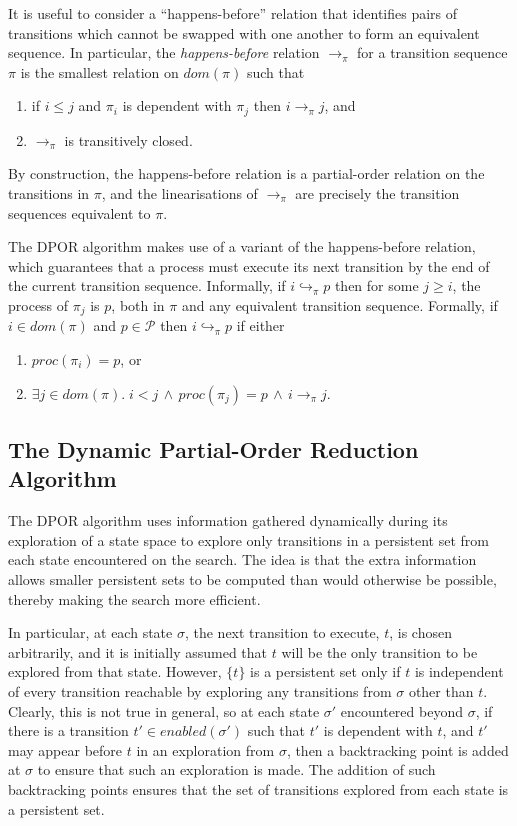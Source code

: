 \documentclass[12pt,a4paper,twoside,openany]{report}
\begin{document}
It is useful to consider a
``happens-before'' relation that identifies
pairs of transitions which
cannot be swapped with one another
to form an equivalent sequence.
In particular, the \emph{happens-before}
relation $\longrightarrow_\pi$ for a transition
sequence $\pi$ is the smallest relation on
$\textit{dom}(\pi)$ such that
\begin{enumerate}
	\item if $i \leq j$ and $\pi_i$ is dependent with
		$\pi_j$ then $i \longrightarrow_\pi j$, and
	\item $\longrightarrow_\pi$ is transitively closed.
\end{enumerate}
By construction, the happens-before relation is a
partial-order relation on the transitions in $\pi$,
and the linearisations of $\longrightarrow_\pi$
are precisely the transition sequences equivalent
to $\pi$.

The DPOR algorithm makes use of a variant of the
happens-before relation, which guarantees that a
process must execute its next transition by the
end of the current transition sequence.
Informally, if $i \hookrightarrow_\pi p$ then
for some $j \geq i$,
the process of $\pi_j$ 
is $p$, both in $\pi$ and any
equivalent transition sequence.
Formally, 
if $i \in \textit{dom}(\pi)$ and $p \in
\mathcal{P}$ then $i \hookrightarrow_\pi p$ if
either
\begin{enumerate}
	\item $\textit{proc}(\pi_i) = p$, or
	\item $\exists j \in \textit{dom}(\pi).\;
	i < j \,\wedge\, \textit{proc}(\pi_j) = p
	\,\wedge\, i \longrightarrow_\pi j $.
\end{enumerate}


\subsection{The Dynamic Partial-Order Reduction Algorithm}

The DPOR algorithm
uses information gathered dynamically during its
exploration of a state space to explore only
transitions in a persistent set from each state
encountered on the search. The idea is that the
extra information allows smaller
persistent sets to be computed than would
otherwise be possible, thereby making the
search more efficient.

In particular, at each state $\sigma$, the
next transition
to execute, $t$, is chosen arbitrarily, and it is
initially assumed that $t$ will
be the only transition to be explored from
that state. However, $\{t\}$ is a persistent
set only if $t$ is
independent of every transition reachable
by exploring any transitions
from $\sigma$ other than $t$. Clearly,
this is not true in general, so at each
state $\sigma'$ encountered beyond
$\sigma$, if there is a transition
$t' \in \textit{enabled}(\sigma')$
such that $t'$ is dependent with
$t$, and $t'$ may appear before $t$
in an exploration from $\sigma$, then
a backtracking point is added at
$\sigma$ to ensure that such an
exploration is made.
The addition of such backtracking points
ensures that the set of transitions
explored from each state is a
persistent set.
\end{document}
